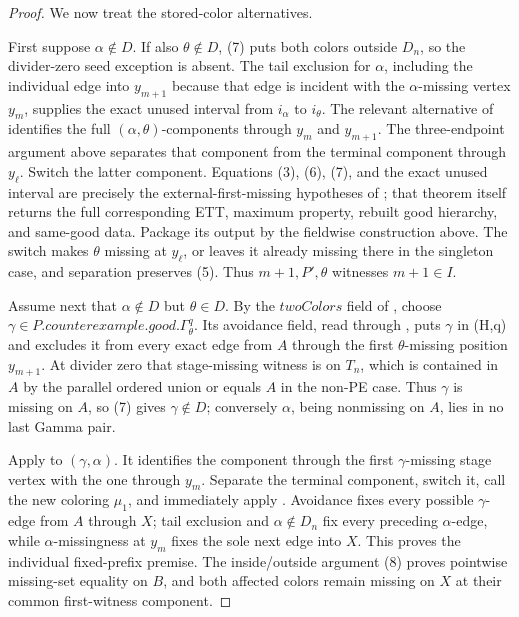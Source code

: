 \begin{proof}
We now treat the stored-color alternatives.

First suppose \(\alpha\notin D\).  If also \(\theta\notin D\), (7) puts
both colors outside \(D_n\), so the divider-zero seed exception is absent.
The tail exclusion for \(\alpha\), including the individual edge into
\(y_{m+1}\) because that edge is incident with the
\(\alpha\)-missing vertex \(y_m\), supplies the exact unused interval from
\(i_\alpha\) to \(i_\theta\).  The relevant alternative of
 identifies the full \((\alpha,\theta)\)-components
through \(y_m\) and \(y_{m+1}\).  The three-endpoint argument above
separates that component from the terminal component through \(y_\ell\).
Switch the latter component.  Equations (3), (6), (7), and the exact unused
interval are precisely the external-first-missing hypotheses of
; that theorem itself returns the full
corresponding ETT, maximum property, rebuilt good hierarchy, and same-good
data.  Package its output by the fieldwise construction above.  The switch
makes \(\theta\) missing at \(y_\ell\), or leaves it already missing there
in the singleton case, and separation preserves (5).  Thus
\(m+1,P',\theta\) witnesses \(m+1\in I\).

Assume next that \(\alpha\notin D\) but \(\theta\in D\).  By the
\(\mathit{twoColors}\) field of , choose
\(\gamma\in P.\mathit{counterexample}.\mathit{good}.\Gamma^q_\theta\).
Its avoidance field, read
through , puts \(\gamma\) in
(H,q)\) and excludes it from every
exact edge from \(A\) through the first \(\theta\)-missing position
\(y_{m+1}\).  At divider zero that stage-missing witness is on \(T_n\),
which is contained in \(A\) by the parallel ordered union or equals \(A\)
in the non-PE case.  Thus \(\gamma\) is missing on \(A\), so (7) gives
\(\gamma\notin D\); conversely \(\alpha\), being nonmissing on \(A\), lies
in no last Gamma pair.

Apply  to \((\gamma,\alpha)\).  It identifies the
component through the first \(\gamma\)-missing stage vertex with the one
through \(y_m\).  Separate the terminal component, switch it, call the new
coloring \(\mu_1\), and immediately apply
.  Avoidance fixes every possible
\(\gamma\)-edge from \(A\) through \(X\); tail exclusion and
\(\alpha\notin D_n\) fix every preceding \(\alpha\)-edge, while
\(\alpha\)-missingness at \(y_m\) fixes the sole next edge into \(X\).
This proves
the individual fixed-prefix premise.  The inside/outside argument (8)
proves pointwise missing-set equality on \(B\), and both affected colors
remain missing on \(X\) at their common first-witness component.


\end{proof}
